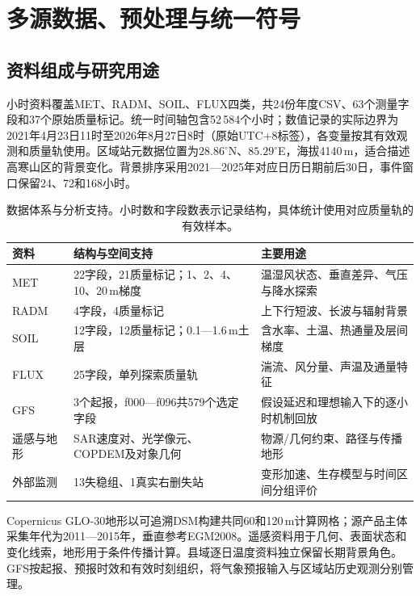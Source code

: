 \section{多源数据、预处理与统一符号}\label{sec:data}
\subsection{资料组成与研究用途}
小时资料覆盖MET、RADM、SOIL、FLUX四类，共24份年度CSV、63个测量字段和37个原始质量标记。统一时间轴包含52\,584个小时；数值记录的实际边界为2021年4月23日11时至2026年8月27日8时（原始UTC+8标签），各变量按其有效观测和质量轨使用。区域站元数据位置为$28.86^{\circ}$N、$85.29^{\circ}$E，海拔4140\,m，适合描述高寒山区的背景变化\cite{common-waternet}。背景排序采用2021—2025年对应日历日期前后30日，事件窗口保留24、72和168小时。

\begin{table}[htbp]
\centering\small
\caption{数据体系与分析支持。小时数和字段数表示记录结构，具体统计使用对应质量轨的有效样本。}\label{tab:common-data}
\begin{tabularx}{\linewidth}{p{2.05cm}p{2.65cm}Y}
\toprule
资料 & 结构与空间支持 & 主要用途\\
\midrule
MET & 22字段，21质量标记；1、2、4、10、20\,m梯度 & 温湿风状态、垂直差异、气压与降水探索\\
RADM & 4字段，4质量标记 & 上下行短波、长波与辐射背景\\
SOIL & 12字段，12质量标记；0.1—1.6\,m土层 & 含水率、土温、热通量及层间梯度\\
FLUX & 25字段，单列探索质量轨 & 湍流、风分量、声温及通量特征\\
GFS & 3个起报，f000—f096共579个选定字段 & 假设延迟和理想输入下的逐小时机制回放\\
遥感与地形 & SAR速度对、光学像元、COPDEM及对象几何 & 物源/几何约束、路径与传播地形\\
外部监测 & 13失稳组、1真实右删失站 & 变形加速、生存模型与时间区间分组评价\\
\bottomrule
\end{tabularx}
\end{table}

Copernicus GLO-30地形以可追溯DSM构建共同60和120\,m计算网格；源产品主体采集年代为2011—2015年，垂直参考EGM2008\cite{common-copdem}。遥感资料用于几何、表面状态和变化线索，地形用于条件传播计算。县域逐日温度资料独立保留长期背景角色。GFS按起报、预报时效和有效时刻组织，将气象预报输入与区域站历史观测分别管理\cite{common-gfs}。

